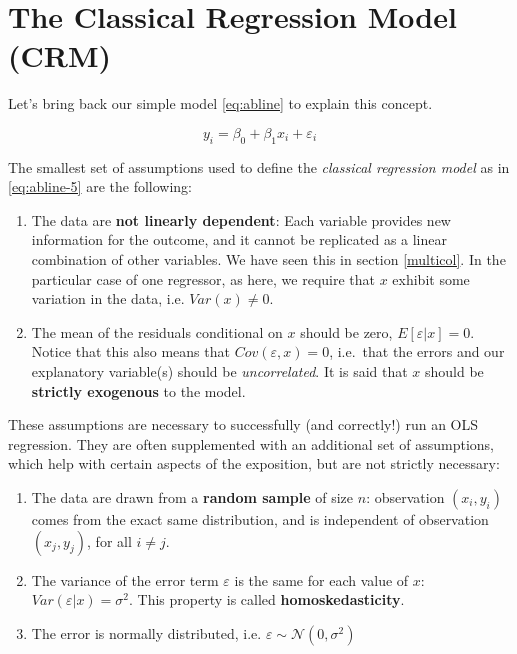 \documentclass[]{book}
\providecommand{\tightlist}{%
  \setlength{\itemsep}{0pt}\setlength{\parskip}{0pt}}
\begin{document}
\hypertarget{class-reg}{%
\section{The Classical Regression Model (CRM)}\label{class-reg}}

Let's bring back our simple model \eqref{eq:abline} to explain this concept.

\begin{equation}
y_i = \beta_0 + \beta_1 x_i + \varepsilon_i \label{eq:abline-5}
\end{equation}

The smallest set of assumptions used to define the \emph{classical regression model} as in \eqref{eq:abline-5} are the following:

\begin{enumerate}
\def\labelenumi{\arabic{enumi}.}
\tightlist
\item
  The data are \textbf{not linearly dependent}: Each variable provides new information for the outcome, and it cannot be replicated as a linear combination of other variables. We have seen this in section \ref{multicol}. In the particular case of one regressor, as here, we require that \(x\) exhibit some variation in the data, i.e. \(Var(x)\neq 0\).
\item
  The mean of the residuals conditional on \(x\) should be zero, \(E[\varepsilon|x] = 0\). Notice that this also means that \(Cov(\varepsilon,x) = 0\), i.e.~that the errors and our explanatory variable(s) should be \emph{uncorrelated}. It is said that \(x\) should be \textbf{strictly exogenous} to the model.
\end{enumerate}

These assumptions are necessary to successfully (and correctly!) run an OLS regression. They are often supplemented with an additional set of assumptions, which help with certain aspects of the exposition, but are not strictly necessary:

\begin{enumerate}
\def\labelenumi{\arabic{enumi}.}
\setcounter{enumi}{2}
\tightlist
\item
  The data are drawn from a \textbf{random sample} of size \(n\): observation \((x_i,y_i)\) comes from the exact same distribution, and is independent of observation \((x_j,y_j)\), for all \(i\neq j\).
\item
  The variance of the error term \(\varepsilon\) is the same for each value of \(x\): \(Var(\varepsilon|x) = \sigma^2\). This property is called \textbf{homoskedasticity}.
\item
  The error is normally distributed, i.e. \(\varepsilon \sim \mathcal{N}(0,\sigma^2)\)
\end{enumerate}
\end{document}
